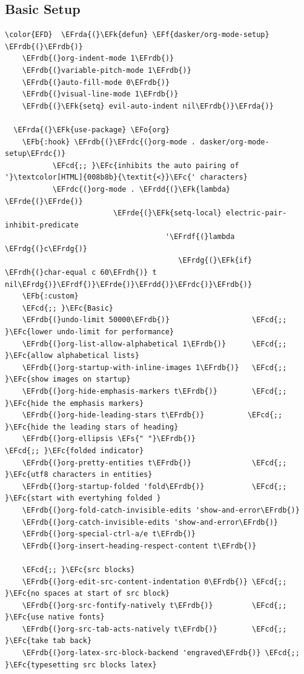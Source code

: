 \documentclass[11pt]{article}
\newcommand{\EFc}[1]{\textcolor{EFc}{#1}} %
\newcommand{\EFcd}[1]{\textcolor{EFcd}{#1}} %
\newcommand{\EFs}[1]{\textcolor{EFs}{#1}} %
\newcommand{\EFk}[1]{\textcolor{EFk}{#1}} %
\newcommand{\EFb}[1]{\textcolor{EFb}{#1}} %
\newcommand{\EFf}[1]{\textcolor{EFf}{#1}} %
\newcommand{\EFo}[1]{\textcolor{EFo}{#1}} %
\newcommand{\EFrda}[1]{\textcolor{EFrda}{#1}} %
\newcommand{\EFrdb}[1]{\textcolor{EFrdb}{#1}} %
\newcommand{\EFrdc}[1]{\textcolor{EFrdc}{#1}} %
\newcommand{\EFrdd}[1]{\textcolor{EFrdd}{#1}} %
\newcommand{\EFrde}[1]{\textcolor{EFrde}{#1}} %
\newcommand{\EFrdf}[1]{\textcolor{EFrdf}{#1}} %
\newcommand{\EFrdg}[1]{\textcolor{EFrdg}{#1}} %
\newcommand{\EFrdh}[1]{\textcolor{EFrdh}{#1}} %
\begin{document}
\subsection{Basic Setup}
\label{sec:orgb2bad5d}
\begin{Code}
\begin{Verbatim}
\color{EFD}  \EFrda{(}\EFk{defun} \EFf{dasker/org-mode-setup} \EFrdb{(}\EFrdb{)}
    \EFrdb{(}org-indent-mode 1\EFrdb{)}
    \EFrdb{(}variable-pitch-mode 1\EFrdb{)}
    \EFrdb{(}auto-fill-mode 0\EFrdb{)}
    \EFrdb{(}visual-line-mode 1\EFrdb{)}
    \EFrdb{(}\EFk{setq} evil-auto-indent nil\EFrdb{)}\EFrda{)}

  \EFrda{(}\EFk{use-package} \EFo{org}
    \EFb{:hook} \EFrdb{(}\EFrdc{(}org-mode . dasker/org-mode-setup\EFrdc{)}
           \EFcd{;; }\EFc{inhibits the auto pairing of '}\textcolor[HTML]{008b8b}{\textit{<}}\EFc{' characters}
           \EFrdc{(}org-mode . \EFrdd{(}\EFk{lambda} \EFrde{(}\EFrde{)} 
                         \EFrde{(}\EFk{setq-local} electric-pair-inhibit-predicate
                                     '\EFrdf{(}lambda \EFrdg{(}c\EFrdg{)}
                                        \EFrdg{(}\EFk{if} \EFrdh{(}char-equal c 60\EFrdh{)} t nil\EFrdg{)}\EFrdf{)}\EFrde{)}\EFrdd{)}\EFrdc{)}\EFrdb{)}
    \EFb{:custom}
    \EFcd{;; }\EFc{Basic}
    \EFrdb{(}undo-limit 50000\EFrdb{)}                   \EFcd{;; }\EFc{lower undo-limit for performance}
    \EFrdb{(}org-list-allow-alphabetical 1\EFrdb{)}      \EFcd{;; }\EFc{allow alphabetical lists}
    \EFrdb{(}org-startup-with-inline-images 1\EFrdb{)}   \EFcd{;; }\EFc{show images on startup}
    \EFrdb{(}org-hide-emphasis-markers t\EFrdb{)}        \EFcd{;; }\EFc{hide the emphasis markers}
    \EFrdb{(}org-hide-leading-stars t\EFrdb{)}          \EFcd{;; }\EFc{hide the leading stars of heading}
    \EFrdb{(}org-ellipsis \EFs{" "}\EFrdb{)}                   \EFcd{;; }\EFc{folded indicator}
    \EFrdb{(}org-pretty-entities t\EFrdb{)}              \EFcd{;; }\EFc{utf8 characters in entities}
    \EFrdb{(}org-startup-folded 'fold\EFrdb{)}           \EFcd{;; }\EFc{start with evertyhing folded }
    \EFrdb{(}org-fold-catch-invisible-edits 'show-and-error\EFrdb{)}
    \EFrdb{(}org-catch-invisible-edits 'show-and-error\EFrdb{)}
    \EFrdb{(}org-special-ctrl-a/e t\EFrdb{)}
    \EFrdb{(}org-insert-heading-respect-content t\EFrdb{)}

    \EFcd{;; }\EFc{src blocks}
    \EFrdb{(}org-edit-src-content-indentation 0\EFrdb{)} \EFcd{;; }\EFc{no spaces at start of src block}
    \EFrdb{(}org-src-fontify-natively t\EFrdb{)}         \EFcd{;; }\EFc{use native fonts}
    \EFrdb{(}org-src-tab-acts-natively t\EFrdb{)}        \EFcd{;; }\EFc{take tab back}
    \EFrdb{(}org-latex-src-block-backend 'engraved\EFrdb{)} \EFcd{;; }\EFc{typesetting src blocks latex}


\end{Verbatim}
\end{Code}
\end{document}
